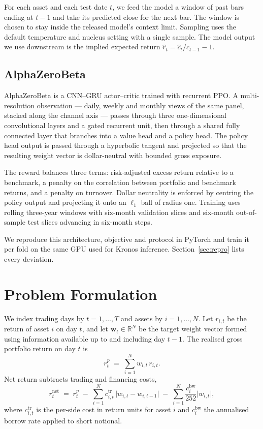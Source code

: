 \documentclass[conference]{IEEEtran}
\begin{document}
For each asset and each test date $t$, we feed the model a window of past bars
ending at $t-1$ and take its predicted close for the next bar. The window is
chosen to stay inside the released model's context limit. Sampling uses the
default temperature and nucleus setting with a single sample. The model output
we use downstream is the implied expected return
$\hat{r}_t = \hat{c}_t/c_{t-1} - 1$.

\subsection{AlphaZeroBeta}
AlphaZeroBeta is a CNN--GRU actor--critic trained with recurrent PPO. A
multi-resolution observation --- daily, weekly and monthly views of the same
panel, stacked along the channel axis --- passes through three one-dimensional
convolutional layers and a gated recurrent unit, then through a shared fully
connected layer that branches into a value head and a policy head. The policy
head output is passed through a hyperbolic tangent and projected so that the
resulting weight vector is dollar-neutral with bounded gross exposure.

The reward balances three terms: risk-adjusted excess return relative to a
benchmark, a penalty on the correlation between portfolio and benchmark
returns, and a penalty on turnover. Dollar neutrality is enforced by centring
the policy output and projecting it onto an $\ell_1$ ball of radius one.
Training uses rolling three-year windows with six-month validation slices and
six-month out-of-sample test slices advancing in six-month steps.

We reproduce this architecture, objective and protocol \cite{belyakov2026alphazerobeta}
in PyTorch and train it per fold on the same GPU used for Kronos inference. Section~\ref{sec:repro}
lists every deviation.

\section{Problem Formulation}
\label{sec:problem}
We index trading days by $t=1,\dots,T$ and assets by $i=1,\dots,N$. Let
$r_{i,t}$ be the return of asset $i$ on day $t$, and let $\mathbf{w}_t \in
\mathbb{R}^N$ be the target weight vector formed using information available up
to and including day $t-1$. The realised gross portfolio return on day $t$ is
\begin{equation}
r^{p}_{t} \;=\; \sum_{i=1}^{N} w_{i,t}\, r_{i,t}.
\end{equation}
Net return subtracts trading and financing costs,
\begin{equation}
r^{\text{net}}_{t} \;=\; r^{p}_{t}
\;-\; \sum_{i=1}^{N} c^{\text{tr}}_{i,t}\,\lvert w_{i,t}-w_{i,t-1}\rvert
\;-\; \sum_{i=1}^{N} \frac{c^{\text{bw}}_{i}}{252}\lvert w_{i,t}\rvert,
\end{equation}
where $c^{\text{tr}}_{i,t}$ is the per-side cost in return units for asset $i$
and $c^{\text{bw}}_{i}$ the annualised borrow rate applied to short notional.
\end{document}
